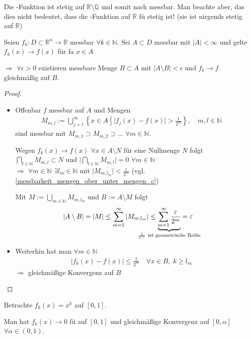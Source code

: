 \begin{underlinedenvironment}[Hinweis]
	Die -Funktion ist stetig auf $\mathbb{R}\setminus\mathbb{Q}$ und somit nach  messbar. Man beachte aber, das dies nicht bedeutet, dass die -Funktion auf $\mathbb{R}$ \gls{fü} stetig ist! (sie ist nirgends stetig auf $\mathbb{R}$)
\end{underlinedenvironment}

\begin{lemma}[Egorov]
	Seien $f_k:D\subset\mathbb{R}^n\to\mathbb{R}$ messbar $\forall k\in\mathbb{N}$. Sei $A\subset D$ messbar mit $\vert A \vert < \infty$ und gelte $f_k(x)\to f(x)$ für \gls{fa} $x\in A$
	
	$\Rightarrow$ $\forall \epsilon > 0$ existieren messbare Menge $B\subset A$ mit $\vert A \setminus B \vert < \epsilon$ und $f_k \to f$ gleichmäßig auf $B$.
\end{lemma}

\begin{proof}\hspace*{0pt}
	\begin{itemize}[topsep=\dimexpr -\baselineskip / 2 \relax]
	\item 
	Offenbar $f$ messbar auf $A$ und Mengen \begin{align*}
		M_{m,l} := \bigcup_{j=l}^\infty \left\{ x\in A \;\left| \; \vert f_j(x) - f(x)\vert > \frac{1}{2^m} \right. \right\},\quad m,l\in\mathbb{N}
	\end{align*}
	sind messbar mit $M_{m,1} \supset M_{m,2} \supset \dotsc$ $\forall m\in\mathbb{N}$.
	
	Wegen $f_k(x) \to f(x)$ $\forall x\in A\setminus N$ für eine Nullmenge $N$ folgt $\bigcap_{l\in\mathbb{N}} M_{m,l} \subset N$ und $\vert \bigcap_{l\in\mathbb{N}} M_{m,l} \vert = 0$ $\forall m\in\mathbb{N}$ \\
	$\Rightarrow$ $\forall m\in\mathbb{N}$ $\exists l_m \in\mathbb{N}$ mit $\vert M_{m,l_m} \vert < \frac{\epsilon}{2^m}$ (vgl.  \ref{messbarkeit_mengen_ober_unter_mengen_c})
	
	Mit $M:=\bigcup_{m\in\mathbb{N}} M_{m,l_m}$ und $B:= A\setminus M$ folgt \begin{align*}
		\vert A \setminus B \vert &= \vert M \vert \le \sum_{m=1}^\infty \vert M_{m,l_m} \vert \le \underbrace{\sum_{m=1}^\infty \frac{\epsilon}{2^m}}_{\mathclap{\frac{1}{2^m}\text{ ist geometrische Reihe}}} = \epsilon
	\end{align*}
	\item Weiterhin hat man $\forall m\in\mathbb{N}$ \begin{align*}
		\vert f_k(x) - f(x) \vert \le \frac{1}{2^m}\quad\forall x\in B,\;k \ge l_m
	\end{align*}
	$\Rightarrow$ gleichmäßige Konvergenz auf $B$
	\end{itemize}
\end{proof}

\begin{example}
	Betrachte $f_k(x) = x^k$ auf $[0,1]$.
	
	Man hat $f_k(x) \to 0$ \gls{fü} auf $[0,1]$ und gleichmäßige Konvergenz auf $[0,\alpha]$ $\forall \alpha\in (0,1)$.
\end{example}